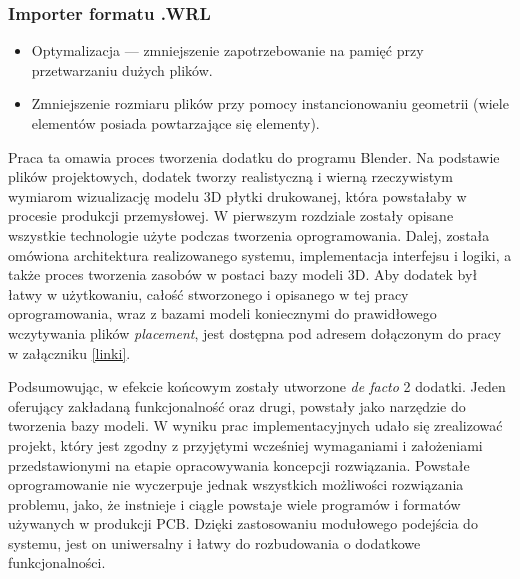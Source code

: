 \documentclass{xmgr}
\begin{document}
\subsubsection{Importer formatu .WRL}
\begin{itemize}
\item Optymalizacja --- zmniejszenie zapotrzebowanie na pamięć przy przetwarzaniu dużych plików.
\item Zmniejszenie rozmiaru plików przy pomocy instancionowaniu geometrii (wiele elementów posiada powtarzające się elementy).
\end{itemize}







\summary

Praca ta omawia proces tworzenia dodatku do programu Blender. Na podstawie plików projektowych, dodatek tworzy realistyczną i wierną rzeczywistym wymiarom wizualizację modelu 3D płytki drukowanej, która powstałaby w procesie produkcji przemysłowej. W pierwszym rozdziale zostały opisane wszystkie technologie użyte podczas tworzenia oprogramowania. Dalej, została omówiona architektura realizowanego systemu, implementacja interfejsu i logiki, a także proces tworzenia zasobów w postaci bazy modeli 3D.
Aby dodatek był łatwy w użytkowaniu, całość stworzonego i opisanego w tej pracy oprogramowania, wraz z bazami modeli koniecznymi do prawidłowego wczytywania plików \emph{placement}, jest dostępna pod adresem dołączonym do pracy w załączniku \ref{linki}. 

Podsumowując, w efekcie końcowym zostały utworzone \emph{de facto} 2 dodatki. Jeden oferujący zakładaną funkcjonalność oraz drugi, powstały jako narzędzie do tworzenia bazy modeli. W wyniku prac implementacyjnych udało się zrealizować projekt, który jest zgodny z przyjętymi wcześniej wymaganiami i założeniami przedstawionymi na etapie opracowywania koncepcji rozwiązania. Powstałe oprogramowanie nie wyczerpuje jednak wszystkich możliwości rozwiązania problemu, jako, że instnieje i ciągle powstaje wiele programów i formatów używanych w produkcji PCB. Dzięki zastosowaniu modułowego podejścia do systemu, jest on uniwersalny i łatwy do rozbudowania o dodatkowe funkcjonalności.
\end{document}
